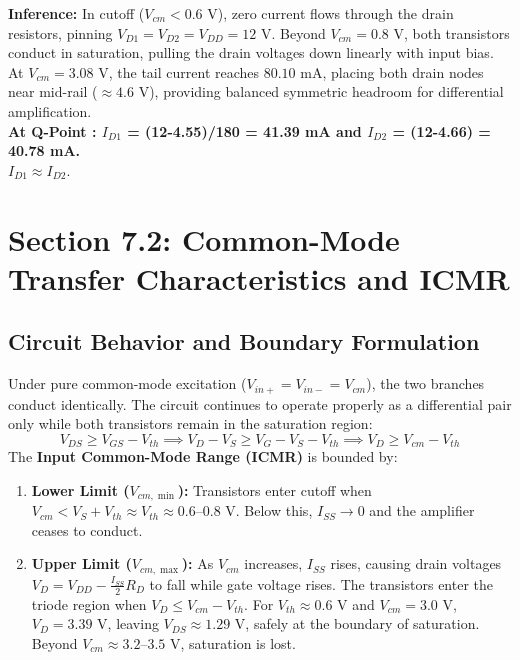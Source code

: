 \documentclass[11pt,a4paper]{article}
\begin{document}
\noindent\textbf{Inference:} In cutoff ($V_{cm} < 0.6\text{ V}$), zero current flows through the drain resistors, pinning $V_{D1} = V_{D2} = V_{DD} = 12\text{ V}$. Beyond $V_{cm} = 0.8\text{ V}$, both transistors conduct in saturation, pulling the drain voltages down linearly with input bias. At $V_{cm} = 3.08\text{ V}$, the tail current reaches $80.10\text{ mA}$, placing both drain nodes near mid-rail ($\approx 4.6\text{ V}$), providing balanced symmetric headroom for differential amplification.
\\\textbf{At Q-Point : $I_{D1}$ = (12-4.55)/180 = 41.39 mA and $I_{D2}$ = (12-4.66) = 40.78 mA.\\
$I_{D1} \approx I_{D2}$}.
\newpage
\section{Section 7.2: Common-Mode Transfer Characteristics and ICMR}
\subsection{Circuit Behavior and Boundary Formulation}
Under pure common-mode excitation ($V_{in+} = V_{in-} = V_{cm}$), the two branches conduct identically. The circuit continues to operate properly as a differential pair only while both transistors remain in the saturation region:
\begin{equation}
    V_{DS} \ge V_{GS} - V_{th} \implies V_D - V_S \ge V_G - V_S - V_{th} \implies V_D \ge V_{cm} - V_{th}
\end{equation}
The \textbf{Input Common-Mode Range (ICMR)} is bounded by:
\begin{enumerate}
    \item \textbf{Lower Limit ($V_{cm,\min}$):} Transistors enter cutoff when $V_{cm} < V_S + V_{th} \approx V_{th} \approx 0.6\text{--}0.8\text{ V}$. Below this, $I_{SS} \to 0$ and the amplifier ceases to conduct.
    \item \textbf{Upper Limit ($V_{cm,\max}$):} As $V_{cm}$ increases, $I_{SS}$ rises, causing drain voltages $V_D = V_{DD} - \frac{I_{SS}}{2} R_D$ to fall while gate voltage rises. The transistors enter the triode region when $V_D \le V_{cm} - V_{th}$. For $V_{th} \approx 0.6\text{ V}$ and $V_{cm} = 3.0\text{ V}$, $V_D = 3.39\text{ V}$, leaving $V_{DS} \approx 1.29\text{ V}$, safely at the boundary of saturation. Beyond $V_{cm} \approx 3.2\text{--}3.5\text{ V}$, saturation is lost.
\end{enumerate}
\end{document}
